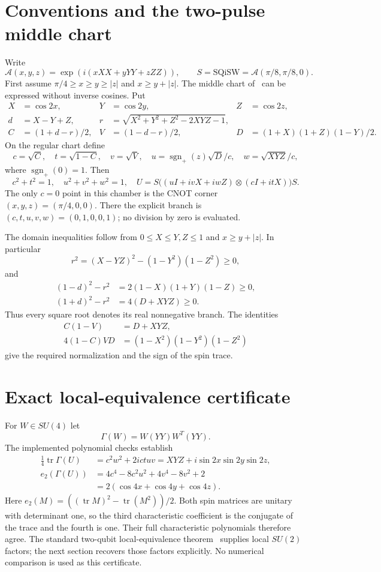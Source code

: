 \documentclass[11pt]{article}
\newcommand{\A}{\mathcal A}
\newcommand{\Sqi}{\mathrm{SQiSW}}
\begin{document}
\section{Conventions and the two-pulse middle chart}
Write
\[
 \A(x,y,z)=\exp(i(xXX+yYY+zZZ)),\qquad
 S=\Sqi=\A(\pi/8,\pi/8,0).
\]
First assume $\pi/4\geq x\geq y\geq |z|$ and $x\geq y+|z|$.
The middle chart of~\cite{sq} can be expressed without inverse cosines.
Put
\begin{align*}
 X&=\cos2x,&Y&=\cos2y,&Z&=\cos2z,\\
 d&=X-Y+Z,&r&=\sqrt{X^2+Y^2+Z^2-2XYZ-1},\\
 C&=(1+d-r)/2,&V&=(1-d-r)/2,&D&=(1+X)(1+Z)(1-Y)/2.
\end{align*}
On the regular chart define
\[
 c=\sqrt C,\quad t=\sqrt{1-C},\quad v=\sqrt V,\quad
 u=\operatorname{sgn}_+(z)\sqrt D/c,\quad w=\sqrt{XYZ}/c,
\]
where $\operatorname{sgn}_+(0)=1$. Then
\[
 c^2+t^2=1,\quad u^2+v^2+w^2=1,\quad
 U=S\big((uI+ivX+iwZ)\otimes(cI+itX)\big)S.
\]
The only $c=0$ point in this chamber is the CNOT corner
$(x,y,z)=(\pi/4,0,0)$. There the explicit branch is
$(c,t,u,v,w)=(0,1,0,0,1)$; no division by zero is evaluated.

The domain inequalities follow from $0\leq X\leq Y,Z\leq1$ and
$x\geq y+|z|$. In particular
\[
 r^2=(X-YZ)^2-(1-Y^2)(1-Z^2)\geq0,
\]
and
\begin{align*}
 (1-d)^2-r^2&=2(1-X)(1+Y)(1-Z)\geq0,\\
 (1+d)^2-r^2&=4(D+XYZ)\geq0.
\end{align*}
Thus every square root denotes its real nonnegative branch. The identities
\begin{align*}
 C(1-V)&=D+XYZ,\\
 4(1-C)VD&=(1-X^2)(1-Y^2)(1-Z^2)
\end{align*}
give the required normalization and the sign of the spin trace.

\section{Exact local-equivalence certificate}
For $W\in SU(4)$ let
\[
 \Gamma(W)=W(YY)W^T(YY).
\]
The implemented polynomial checks establish
\begin{align*}
 \tfrac14\operatorname{tr}\Gamma(U)&=c^2w^2+2ictuv
       =XYZ+i\sin2x\sin2y\sin2z,\\
 e_2(\Gamma(U))&=4c^4-8c^2u^2+4v^4-8v^2+2\\
       &=2(\cos4x+\cos4y+\cos4z).
\end{align*}
Here $e_2(M)=((\operatorname{tr}M)^2-\operatorname{tr}(M^2))/2$.
Both spin matrices are unitary with determinant one, so the third
characteristic coefficient is the conjugate of the trace and the fourth
is one. Their full characteristic polynomials therefore agree.
The standard two-qubit local-equivalence theorem~\cite{makhlin} supplies
local $SU(2)$ factors; the next section recovers those factors explicitly.
No numerical comparison is used as this certificate.
\end{document}
